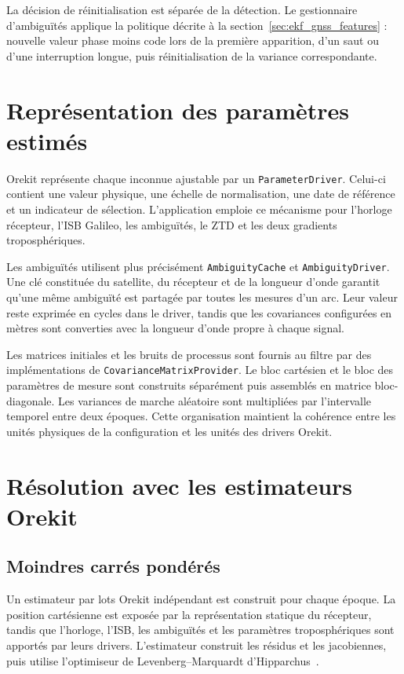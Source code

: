 La décision de réinitialisation est séparée de la détection. Le gestionnaire
d'ambiguïtés applique la politique décrite à la
section~\ref{sec:ekf_gnss_features} : nouvelle valeur phase moins code lors de
la première apparition, d'un saut ou d'une interruption longue, puis
réinitialisation de la variance correspondante.


\section{Représentation des paramètres estimés}
\label{sec:estimated_parameters_implementation}

Orekit représente chaque inconnue ajustable par un \texttt{ParameterDriver}.
Celui-ci contient une valeur physique, une échelle de normalisation, une date
de référence et un indicateur de sélection. L'application emploie ce mécanisme
pour l'horloge récepteur, l'ISB Galileo, les ambiguïtés, le ZTD et les deux
gradients troposphériques.

Les ambiguïtés utilisent plus précisément \texttt{AmbiguityCache} et
\texttt{AmbiguityDriver}. Une clé constituée du satellite, du récepteur et de
la longueur d'onde garantit qu'une même ambiguïté est partagée par toutes les
mesures d'un arc. Leur valeur reste exprimée en cycles dans le driver, tandis
que les covariances configurées en mètres sont converties avec la longueur
d'onde propre à chaque signal.

Les matrices initiales et les bruits de processus sont fournis au filtre par
des implémentations de \texttt{CovarianceMatrixProvider}. Le bloc cartésien et
le bloc des paramètres de mesure sont construits séparément puis assemblés en
matrice bloc-diagonale. Les variances de marche aléatoire sont multipliées par
l'intervalle temporel entre deux époques. Cette organisation maintient la
cohérence entre les unités physiques de la configuration et les unités des
drivers Orekit.


\section{Résolution avec les estimateurs Orekit}
\label{sec:orekit_solvers}

\subsection{Moindres carrés pondérés}

Un estimateur par lots Orekit indépendant est construit pour chaque époque. La
position cartésienne est exposée par la représentation statique du récepteur,
tandis que l'horloge, l'ISB, les ambiguïtés et les paramètres troposphériques
sont apportés par leurs drivers. L'estimateur construit les résidus et les
jacobiennes, puis utilise l'optimiseur de Levenberg--Marquardt d'Hipparchus~\cite{hipparchus403}.

